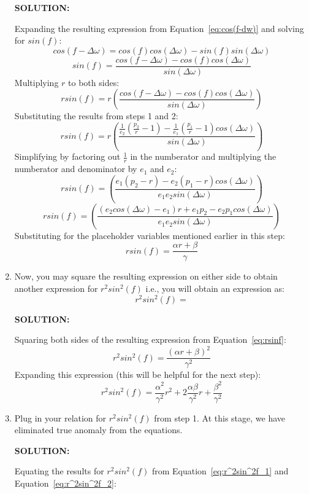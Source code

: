 \documentclass[12pt, letterpaper]{aiaa-tc}
\begin{document}
\begin{enumerate}
    \textbf{SOLUTION:}

    Expanding the resulting expression from Equation~\eqref{eq:cos(f-dw)} and solving for $sin(f)$:
    \[ cos(f-\Delta\omega)=cos(f)cos(\Delta\omega)-sin(f)sin(\Delta\omega) \]
    \[ sin(f)=\frac{cos(f-\Delta\omega)-cos(f)cos(\Delta\omega)}{sin(\Delta\omega)} \]
    Multiplying $r$ to both sides:
    \[ rsin(f)=r\left(\frac{cos(f-\Delta\omega)-cos(f)cos(\Delta\omega)}{sin(\Delta\omega)}\right) \]
    Substituting the results from steps 1 and 2:
    \[ rsin(f)=r\left(\frac{\frac{1}{e_2}\left (\frac{p_2}{r}-1 \right)-\frac{1}{e_1}\left (\frac{p_1}{r}-1 \right)cos(\Delta\omega)}{sin(\Delta\omega)}\right) \]
    Simplifying by factoring out $\frac{1}{r}$ in the numberator and multiplying the numberator and denominator by $e_1$ and $e_2$:
    \[ rsin(f)=\left(\frac{e_1(p_2-r)-e_2(p_1-r)cos(\Delta\omega)}{e_1e_2sin(\Delta\omega)}\right) \]
    \[ rsin(f)=\left(\frac{(e_2cos(\Delta\omega)-e_1)r+e_1p_2-e_2p_1cos(\Delta\omega)}{e_1e_2sin(\Delta\omega)}\right) \]
    Substituting for the placeholder variables mentioned earlier in this step:
    \begin{equation}
        rsin(f)=\frac{\alpha r+\beta}{\gamma}
        \label{eq:rsinf}
    \end{equation}
    \item Now, you may square the resulting expression on either side to obtain another expression for 
    $r^2sin^2(f)$ i.e., you will obtain an expression as:
    \[r^2sin^2(f)= \]
    
    \textbf{SOLUTION:}
    
    Squaring both sides of the resulting expression from Equation~\eqref{eq:rsinf}:
    \[ r^2sin^2(f)=\frac{(\alpha r+\beta)^2}{\gamma^2} \]
    Expanding this expression (this will be helpful for the next step):
    \begin{equation}
        r^2sin^2(f)=\frac{\alpha^2}{\gamma^2}r^2+2\frac{\alpha\beta}{\gamma^2}r+\frac{\beta^2}{\gamma^2}
        \label{eq:r^2sin^2f_2}
    \end{equation}
    \item  Plug in your relation for $r^2sin^2(f)$ from step 1. At this stage, we have eliminated true anomaly from the equations.

    \textbf{SOLUTION:}

    Equating the results for $r^2sin^2(f)$ from Equation~\eqref{eq:r^2sin^2f_1} and Equation~\eqref{eq:r^2sin^2f_2}:
    

\end{enumerate}
\end{document}
